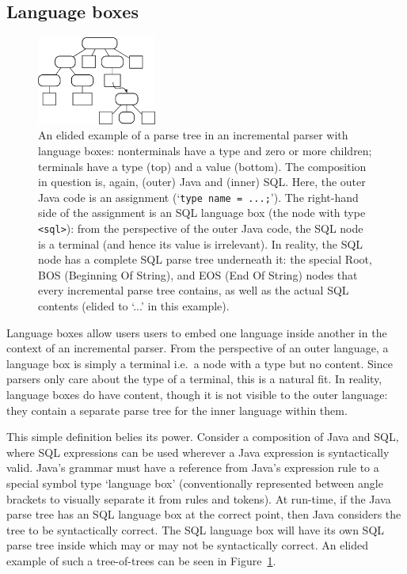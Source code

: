 \documentclass[sigplan,screen]{acmart}\settopmatter{printfolios=true,printccs=false,printacmref=false}
\begin{document}
\subsection{Language boxes}

\begin{figure}[t]
\begin{center}
\includegraphics[width=0.35\textwidth]{images/lbox_parsetree}
\caption{An elided example of a parse tree in an incremental parser with
  language boxes: nonterminals have a type and zero or more children; terminals
  have a type (top) and a value (bottom). The composition in question is,
  again, (outer) Java and (inner) SQL. Here, the outer Java code is an
  assignment (`\texttt{type name = ...;}'). The right-hand side of the
  assignment is an SQL language box (the node with type \texttt{<sql>}): from the
  perspective of the outer Java code, the SQL node is a terminal (and hence its
  value is irrelevant). In reality, the SQL node has a complete SQL parse tree
  underneath it: the special Root, BOS (Beginning Of String), and EOS (End Of
  String) nodes that every incremental parse tree contains, as well as the actual
  SQL contents (elided to `...' in this example). }
\label{fig:lboxtree}
\end{center}
\end{figure}

Language boxes allow users users to embed one language inside another in the
context of an incremental parser. From the perspective of an outer language, a
language box is simply a terminal i.e.~a node with a type but no content. Since
parsers only care about the type of a terminal, this is a natural fit. In
reality, language boxes do have content, though it is not visible to the outer
language: they contain a separate parse tree for the inner language within
them.

This simple definition belies its power. Consider a composition of Java and
SQL, where SQL expressions can be used wherever a Java expression is
syntactically valid. Java's grammar must have a reference from Java's
expression rule to a special symbol type `language box' (conventionally
represented between angle brackets to visually separate it from rules and
tokens). At run-time, if the Java parse tree has an SQL language box at the
correct point, then Java considers the tree to be syntactically correct. The
SQL language box will have its own SQL parse tree inside which may or may not
be syntactically correct. An elided example of such a tree-of-trees can be seen
in Figure~\ref{fig:lboxtree}.
\end{document}
